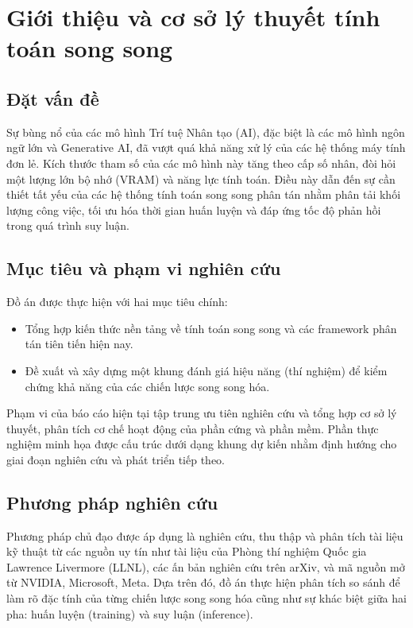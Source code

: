 \section{Giới thiệu và cơ sở lý thuyết tính toán song song}

\subsection{Đặt vấn đề}
Sự bùng nổ của các mô hình Trí tuệ Nhân tạo (AI), đặc biệt là các mô hình ngôn ngữ lớn và Generative AI, đã vượt quá khả năng xử lý của các hệ thống máy tính đơn lẻ. Kích thước tham số của các mô hình này tăng theo cấp số nhân, đòi hỏi một lượng lớn bộ nhớ (VRAM) và năng lực tính toán. Điều này dẫn đến sự cần thiết tất yếu của các hệ thống tính toán song song phân tán nhằm phân tải khối lượng công việc, tối ưu hóa thời gian huấn luyện và đáp ứng tốc độ phản hồi trong quá trình suy luận.

\subsection{Mục tiêu và phạm vi nghiên cứu}
Đồ án được thực hiện với hai mục tiêu chính:
\begin{itemize}
    \item Tổng hợp kiến thức nền tảng về tính toán song song và các framework phân tán tiên tiến hiện nay.
    \item Đề xuất và xây dựng một khung đánh giá hiệu năng (thí nghiệm) để kiểm chứng khả năng của các chiến lược song song hóa.
\end{itemize}
Phạm vi của báo cáo hiện tại tập trung ưu tiên nghiên cứu và tổng hợp cơ sở lý thuyết, phân tích cơ chế hoạt động của phần cứng và phần mềm. Phần thực nghiệm minh họa được cấu trúc dưới dạng khung dự kiến nhằm định hướng cho giai đoạn nghiên cứu và phát triển tiếp theo.

\subsection{Phương pháp nghiên cứu}
Phương pháp chủ đạo được áp dụng là nghiên cứu, thu thập và phân tích tài liệu kỹ thuật từ các nguồn uy tín như tài liệu của Phòng thí nghiệm Quốc gia Lawrence Livermore (LLNL), các ấn bản nghiên cứu trên arXiv, và mã nguồn mở từ NVIDIA, Microsoft, Meta. Dựa trên đó, đồ án thực hiện phân tích so sánh để làm rõ đặc tính của từng chiến lược song song hóa cũng như sự khác biệt giữa hai pha: huấn luyện (training) và suy luận (inference).

